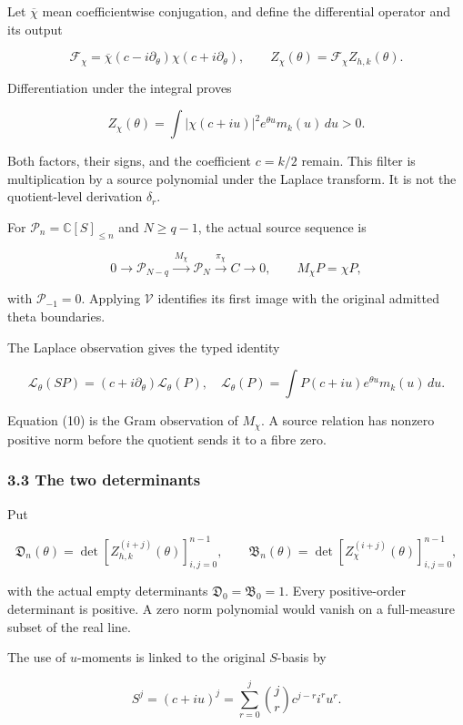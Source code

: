 Let \(\overline\chi\) mean coefficientwise conjugation, and define the
differential operator and its output

\[
\mathcal F_\chi
=\overline\chi(c-i\partial_\theta)\chi(c+i\partial_\theta),
\qquad
Z_\chi(\theta)=\mathcal F_\chi Z_{h,k}(\theta).
\tag{9}
\]

Differentiation under the integral proves

\[
\boxed{Z_\chi(\theta)=\int|\chi(c+iu)|^2e^{\theta u}m_k(u)\,du>0.}
\tag{10}
\]

Both factors, their signs, and the coefficient \(c=k/2\) remain. This
filter is multiplication by a source polynomial under the Laplace
transform. It is not the quotient-level derivation \(\delta_r\).

For \(\mathcal P_n=\mathbb C[S]_{\le n}\) and \(N\ge q-1\), the actual
source sequence is

\[
0\longrightarrow\mathcal P_{N-q}
\xrightarrow{\ M_\chi\ }\mathcal P_N
\xrightarrow{\pi_\chi}C\longrightarrow0,
\qquad M_\chi P=\chi P,
\tag{11}
\]

with \(\mathcal P_{-1}=0\). Applying \(\mathcal V\) identifies its first
image with the original admitted theta boundaries.

The Laplace observation gives the typed identity

\[
\mathscr L_\theta(SP)=(c+i\partial_\theta)\mathscr L_\theta(P),
\quad
\mathscr L_\theta(P)=\int P(c+iu)e^{\theta u}m_k(u)\,du.
\]

Equation (10) is the Gram observation of \(M_\chi\). A source relation
has nonzero positive norm before the quotient sends it to a fibre zero.

\subsubsection{3.3 The two determinants}\label{toda_volume:the-two-determinants}

Put

\[
\mathfrak D_n(\theta)
=\det[Z_{h,k}^{(i+j)}(\theta)]_{i,j=0}^{n-1},
\qquad
\mathfrak B_n(\theta)
=\det[Z_\chi^{(i+j)}(\theta)]_{i,j=0}^{n-1},
\tag{12}
\]

with the actual empty determinants \(\mathfrak D_0=\mathfrak B_0=1\).
Every positive-order determinant is positive. A zero norm polynomial
would vanish on a full-measure subset of the real line.

The use of \(u\)-moments is linked to the original \(S\)-basis by

\[
S^j=(c+iu)^j=\sum_{r=0}^j\binom jr c^{j-r}i^ru^r.
\]

